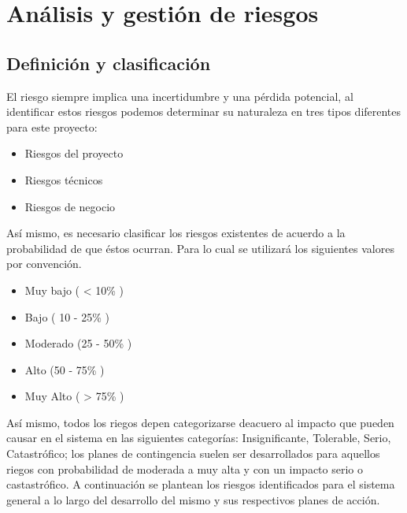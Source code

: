 \section{Análisis y gestión de riesgos}
  \subsection{Definición y clasificación}
    El riesgo siempre implica una incertidumbre y una pérdida potencial, al identificar estos riesgos podemos determinar su naturaleza en tres tipos diferentes para este proyecto:
    \begin{itemize}
      \item Riesgos del proyecto
      \item Riesgos técnicos
      \item Riesgos de negocio
    \end{itemize}
    Así mismo, es necesario clasificar los riesgos existentes de acuerdo  a la probabilidad de que éstos ocurran. Para lo cual se utilizará los siguientes valores por convención.
    \begin{itemize}
      \item Muy bajo ( < 10\% )
      \item Bajo ( 10 - 25\% )
      \item Moderado (25 - 50\% )
      \item Alto (50 - 75\% )
      \item Muy Alto ( > 75\% )
    \end{itemize}
    Así mismo, todos los riegos depen categorizarse deacuero al impacto que pueden causar en el sistema en las siguientes categorías: Insignificante, Tolerable, Serio, Catastrófico; los planes de contingencia suelen ser desarrollados para aquellos riegos con probabilidad de moderada a muy alta y con un impacto serio o castastrófico.
    A continuación se plantean los riesgos identificados para el sistema general a lo largo del desarrollo del mismo y sus respectivos planes de acción.
    \newpage
